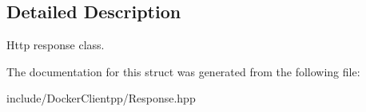 \subsection{Detailed Description}
Http response class. 

The documentation for this struct was generated from the following file\+:\begin{DoxyCompactItemize}
\item 
include/\+Docker\+Clientpp/Response.\+hpp\end{DoxyCompactItemize}
